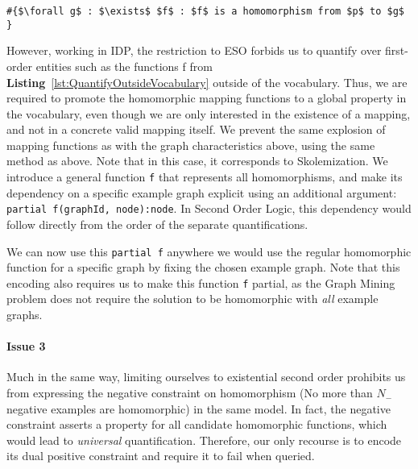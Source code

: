 \begin{lstlisting}[mathescape, caption=Quantifying over functions outside the vocabulary, label=lst:QuantifyOutsideVocabulary,basicstyle=\fontfamily{lmvtt}\selectfont]
#{$\forall g$ : $\exists$ $f$ : $f$ is a homomorphism from $p$ to $g$ }
\end{lstlisting}
However, working in IDP, the restriction to ESO forbids us to quantify over first-order entities such as the functions f from \textbf{Listing}~\ref{lst:QuantifyOutsideVocabulary} outside of the vocabulary.
Thus, we are required to promote the homomorphic mapping functions to a global property in the vocabulary, even though we are only interested in the existence of a mapping, and not in a concrete valid mapping itself.
We prevent the same explosion of mapping functions as with the graph characteristics above, using the same method as above. Note that in this case, it corresponds to Skolemization.
We introduce a general function \verb|f| that represents all homomorphisms, and make its dependency on a specific example graph explicit using an additional argument:
\verb|partial f(graphId, node):node|.
In Second Order Logic, this dependency would follow directly from the order of the separate quantifications.

We can now use this \verb|partial f| anywhere we would use the regular homomorphic function for a specific graph by fixing the chosen example graph.
Note that this encoding also requires us to make this function \verb|f| partial, as the Graph Mining problem does not require the solution to be homomorphic with \emph{all} example graphs.


\paragraph{Issue 3} Much in the same way, limiting ourselves to existential second order prohibits us from expressing the negative constraint on homomorphism (No more than $N_{-}$ negative examples are homomorphic) in the same model.
In fact, the negative constraint asserts a property for all candidate homomorphic functions, which would lead to \emph{universal} quantification.
Therefore, our only recourse is to encode its dual positive constraint and require it to fail when queried.

